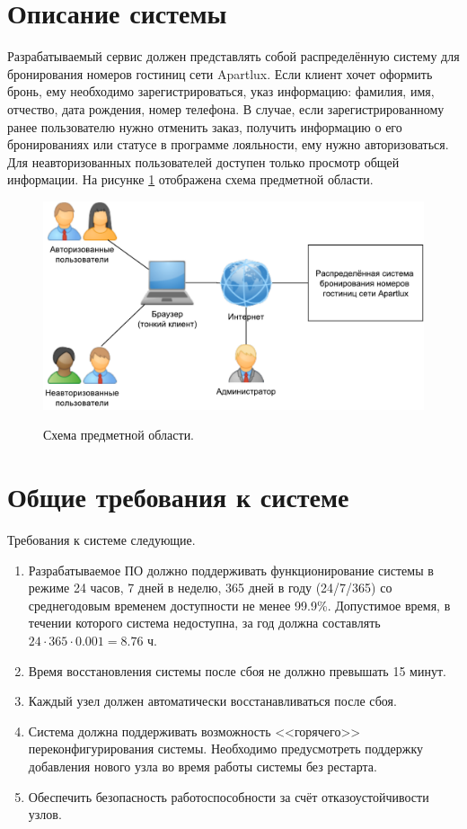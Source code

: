 \section*{Описание системы}
Разрабатываемый сервис должен представлять собой распределённую систему для бронирования номеров гостиниц сети Apartlux. Если клиент хочет оформить бронь, ему необходимо зарегистрироваться, указ информацию: фамилия, имя, отчество, дата рождения, номер телефона. В случае, если зарегистрированному ранее пользователю нужно отменить заказ, получить информацию о его бронированиях или статусе в программе лояльности, ему нужно авторизоваться. Для неавторизованных пользователей доступен только просмотр общей информации. 
На рисунке \ref{fig:schema} отображена схема предметной области.
\begin{figure}[h]
	\begin{center}
		{\includegraphics[scale = 0.6]{img/pic/general.pdf}}
		\caption{Схема предметной области.}
		\label{fig:schema}
	\end{center}
\end{figure}

\pagebreak

\section*{Общие требования к системе}
Требования к системе следующие.
\begin{enumerate}
	\item Разрабатываемое ПО должно поддерживать функционирование системы в режиме 24 часов, 7 дней в неделю, 365 дней в году (24/7/365) со среднегодовым временем доступности не менее 99.9\%. Допустимое время, в течении которого система недоступна, за год должна составлять $24\cdot365\cdot0.001=8.76$ ч.
	
	\item Время восстановления системы после сбоя не должно превышать 15 минут.
	
	\item Каждый узел должен автоматически восстанавливаться после сбоя.
	
	\item Система должна поддерживать возможность <<горячего>> переконфигурирования системы. Необходимо предусмотреть поддержку добавления нового узла во время работы системы без рестарта.
	
	\item Обеспечить безопасность работоспособности за счёт отказоустойчивости узлов.
\end{enumerate}

